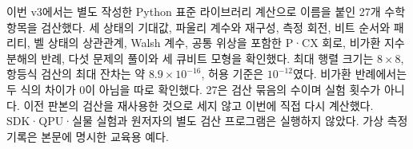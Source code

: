 이번 v3에서는 별도 작성한 Python 표준 라이브러리 계산으로 이름을 붙인 27개 수학 항목을 검산했다.
세 상태의 기대값, 파울리 계수와 재구성, 측정 회전, 비트 순서와 패리티,
벨 상태의 상관관계, Walsh 계수, 공통 위상을 포함한 P·CX 회로,
비가환 지수 분해의 반례, 다섯 문제의 풀이와 세 큐비트 모형을 확인했다.
최대 행렬 크기는 \(8\times8\), 항등식 검산의 최대 잔차는 약 \(8.9\times10^{-16}\),
허용 기준은 \(10^{-12}\)였다. 비가환 반례에서는 두 식의 차이가 0이 아님을 따로 확인했다.
27은 검산 묶음의 수이며 실험 횟수가 아니다.
이전 판본의 검산을 재사용한 것으로 세지 않고 이번에 직접 다시 계산했다.
SDK·QPU·실물 실험과 원저자의 별도 검산 프로그램은 실행하지 않았다.
가상 측정 기록은 본문에 명시한 교육용 예다.
